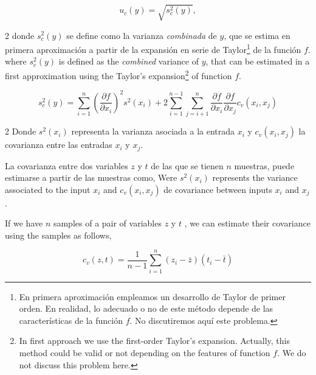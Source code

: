 \begin{equation*}
u_c(y) =\sqrt{s_c^2(y)},
\end{equation*}

\begin{paracol}{2}
donde  $s_c^2(y)$ se define como la  varianza \emph{combinada} de $y$, que se estima en primera aproximación a partir de la expansión en serie de Taylor\footnote{En primera aproximación empleamos un desarrollo de Taylor de primer orden. En realidad, lo adecuado o no de este método depende de las características de la función $f$. No discutiremos aquí este problema.} de la función $f$.	
\switchcolumn
where $s_c^2(y)$ is defined as the \emph{combined} variance of $y$, that can be estimated in a first approximation using the Taylor's expansion\footnote{In first approach we use the first-order Taylor's expansion. Actually, this method could be valid or not depending on the features of function $f$. We do not discuss this problem here.} of function $f$.    
\end{paracol}
\begin{equation*}
s_c^2(y) = \sum_{i=1}^n\left(\frac{\partial f}{\partial x_i}\right)^2 s^2(x_i) + 2\sum_{i=1}^{n-1}\sum_{j=i+1}^n \frac{\partial f}{\partial x_i}\frac{\partial f}{\partial x_j} c_v(x_i,x_j)
\end{equation*}

\begin{paracol}{2}
Donde $s^2(x_i)$  representa la varianza asociada a la entrada $x_i$ y $c_v(x_i, x_j)$ la covarianza entre las entradas $x_i$ y $x_j$. 

La covarianza entre dos variables $z$ y $t$ de las que se tienen $n$ muestras, puede estimarse a partir de las muestras como,
\switchcolumn
Were $s^2(x_i)$ represents the variance associated to the input $x_i$ and $c_v(x_i,x_j)$ de covariance between inputs $x_i$ and $x_j$.

If we have $n$ samples of a pair of variables $z$ y $t$ , we can estimate their covariance using the samples as follows, 
\end{paracol}
\begin{equation*}
c_v(z,t) =\frac{1}{n-1}\sum_{i=1}^n(z_i-\bar{z})(t_i-\bar{t})
\end{equation*}

